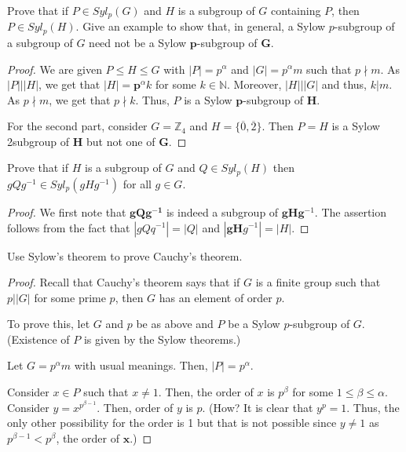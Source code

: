 \begin{exercise}
Prove that if $P \in Syl_p(G)$ and $H$ is a subgroup of $G$ containing $P$, then $P \in Syl_p(H)$. Give an example to show that, in general, a Sylow $p$-subgroup of a subgroup of $G$ need not be a Sylow $\boldsymbol{p}$-subgroup of $\boldsymbol{G}$.
\end{exercise}
\begin{proof}
We are given $P \leq H \leq G$ with $|P|=p^\alpha$ and $|G|=p^\alpha m$ such that $p \nmid  m$. As $|P|||H|$, we get that $| H \mid=\boldsymbol{p}^\alpha k$ for some $k \in \mathbb{N}$.
Moreover, $|H|||G|$ and thus, $k| m$. As $p \nmid  m$, we get that $p \nmid  k$.
Thus, $P$ is a Sylow $\boldsymbol{p}$-subgroup of $\boldsymbol{H}$.

For the second part, consider $G=\mathbb{Z}_4$ and $H=\{\overline{0}, \overline{2}\}$. Then $P=H$ is a Sylow 2subgroup of $\boldsymbol{H}$ but not one of $\boldsymbol{G}$.
\end{proof}

\begin{exercise}
Prove that if $H$ is a subgroup of $G$ and $Q \in Syl_p(H)$ then $g Q g^{-1} \in Syl_p\left(g H g^{-1}\right)$ for all $g \in G$.
\end{exercise}
\begin{proof}
We first note that $\boldsymbol{g Q g ^ { - 1 }}$ is indeed a subgroup of $\boldsymbol{g H} \boldsymbol{g}^{-1}$.
The assertion follows from the fact that $\left|g Q q^{-1}\right|=|Q|$ and $\left|\boldsymbol{g H} g^{-1}\right|=|H|$.
\end{proof}

\begin{exercise}
Use Sylow's theorem to prove Cauchy's theorem.
\end{exercise}
\begin{proof}
Recall that Cauchy's theorem says that if $G$ is a finite group such that $p||G|$ for some prime $p$, then $G$ has an element of order $p$.

To prove this, let $G$ and $p$ be as above and $P$ be a Sylow $p$-subgroup of $G$. (Existence of $P$ is given by the Sylow theorems.)

Let $G=p^\alpha m$ with usual meanings. Then, $|P|=p^\alpha$.

Consider $x \in P$ such that $x \neq 1$. Then, the order of $x$ is $p^\beta$ for some $1 \leq \beta \leq \alpha$. Consider $y=x^{p^{\beta-1}}$. Then, order of $y$ is $p$. (How? It is clear that $y^p=1$. Thus, the only other possibility for the order is 1 but that is not possible since $y \neq 1$ as $p^{\beta-1}<p^\beta$, the order of $\boldsymbol{x}$.)
\end{proof}

